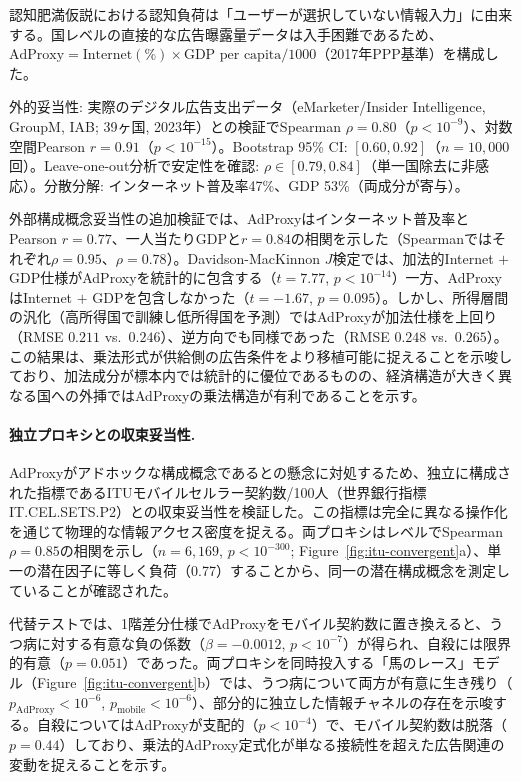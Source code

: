 \documentclass[a4paper,11pt,titlepage]{article}
\begin{document}
認知肥満仮説における認知負荷は「ユーザーが選択していない情報入力」に由来する。国レベルの直接的な広告曝露量データは入手困難であるため、$\text{AdProxy} = \text{Internet}(\%) \times \text{GDP per capita} / 1000$（2017年PPP基準）を構成した。

外的妥当性: 実際のデジタル広告支出データ（eMarketer/Insider Intelligence, GroupM, IAB; 39ヶ国, 2023年）との検証でSpearman $\rho = 0.80$（$p < 10^{-9}$）、対数空間Pearson $r = 0.91$（$p < 10^{-15}$）。Bootstrap 95\% CI: $[0.60, 0.92]$（$n = 10{,}000$回）。Leave-one-out分析で安定性を確認: $\rho \in [0.79, 0.84]$（単一国除去に非感応）。分散分解: インターネット普及率47\%、GDP 53\%（両成分が寄与）。

外部構成概念妥当性の追加検証では、AdProxyはインターネット普及率とPearson $r = 0.77$、一人当たりGDPと$r = 0.84$の相関を示した（Spearmanではそれぞれ$\rho = 0.95$、$\rho = 0.78$）。Davidson-MacKinnon $J$検定では、加法的Internet $+$ GDP仕様がAdProxyを統計的に包含する（$t = 7.77$, $p < 10^{-14}$）一方、AdProxyはInternet $+$ GDPを包含しなかった（$t = -1.67$, $p = 0.095$）。しかし、所得層間の汎化（高所得国で訓練し低所得国を予測）ではAdProxyが加法仕様を上回り（RMSE $0.211$ vs.\ $0.246$）、逆方向でも同様であった（RMSE $0.248$ vs.\ $0.265$）。この結果は、乗法形式が供給側の広告条件をより移植可能に捉えることを示唆しており、加法成分が標本内では統計的に優位であるものの、経済構造が大きく異なる国への外挿ではAdProxyの乗法構造が有利であることを示す。

\paragraph{独立プロキシとの収束妥当性.}
AdProxyがアドホックな構成概念であるとの懸念に対処するため、独立に構成された指標であるITUモバイルセルラー契約数/100人（世界銀行指標IT.CEL.SETS.P2）との収束妥当性を検証した。この指標は完全に異なる操作化を通じて物理的な情報アクセス密度を捉える。両プロキシはレベルでSpearman $\rho = 0.85$の相関を示し（$n = 6{,}169$, $p < 10^{-300}$; Figure~\ref{fig:itu-convergent}a）、単一の潜在因子に等しく負荷（0.77）することから、同一の潜在構成概念を測定していることが確認された。

代替テストでは、1階差分仕様でAdProxyをモバイル契約数に置き換えると、うつ病に対する有意な負の係数（$\beta = -0.0012$, $p < 10^{-7}$）が得られ、自殺には限界的有意（$p = 0.051$）であった。両プロキシを同時投入する「馬のレース」モデル（Figure~\ref{fig:itu-convergent}b）では、うつ病について両方が有意に生き残り（$p_{\text{AdProxy}} < 10^{-6}$, $p_{\text{mobile}} < 10^{-6}$）、部分的に独立した情報チャネルの存在を示唆する。自殺についてはAdProxyが支配的（$p < 10^{-4}$）で、モバイル契約数は脱落（$p = 0.44$）しており、乗法的AdProxy定式化が単なる接続性を超えた広告関連の変動を捉えることを示す。
\end{document}
